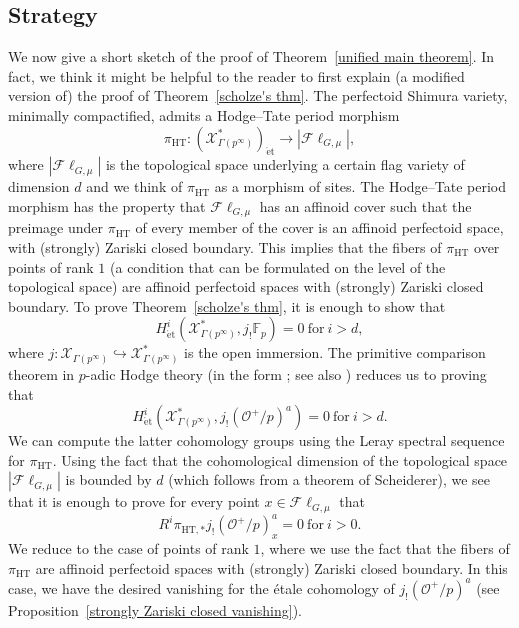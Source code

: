 \documentclass{amsart}
\theoremstyle{remark}
\numberwithin{equation}{subsection}
\newcommand{\F}{\FF}
\newcommand{\FF}{{\mathbb F}}
\newcommand{\cO}{{\mathcal O}}
\newcommand{\cX}{{\mathcal X}}
\newcommand{\HT}{\mathrm{HT}}
\newcommand{\et}{\mathrm{\acute{e}t}}
\newcommand{\Fl}{\mathscr{F}\!\ell}
\renewcommand{\(}{\left(}
\renewcommand{\)}{\right)}
\begin{document}
\subsection{Strategy}\label{strategy} We now give a short sketch of the proof of Theorem~\ref{unified main theorem}. In fact, we think it might be helpful to the reader to first explain (a modified version of) the proof of Theorem~\ref{scholze's thm}. The perfectoid Shimura variety, minimally compactified, admits a Hodge--Tate period morphism
\[
\pi_{\mathrm{HT}}\colon (\cX^*_{\Gamma(p^\infty)})_{\et}\to |\Fl_{G,\mu}|, 
\] 
where $|\Fl_{G,\mu}|$ is the topological space underlying a certain flag variety of dimension $d$ and we think of $\pi_{\HT}$ as a morphism of sites. The Hodge--Tate period morphism has the property that $\Fl_{G,\mu}$ has an affinoid cover such that the preimage under $\pi_{\HT}$ of every member of the cover is an affinoid perfectoid space, with (strongly) Zariski closed boundary. This implies that the fibers of $\pi_{\HT}$ over points of rank $1$ (a condition that can be formulated on the level of the topological space) are affinoid perfectoid spaces with (strongly) Zariski closed boundary. To prove Theorem~\ref{scholze's thm}, it is enough to show that 
\[
H^i_{\et}(\cX^*_{\Gamma(p^\infty)}, j_{!}\F_p)=0\ \mathrm{for}\ i>d,
\]
where $j\colon\cX_{\Gamma(p^\infty)}\hookrightarrow \cX^*_{\Gamma(p^\infty)}$ is the open immersion. The primitive comparison theorem in $p$-adic Hodge theory (in the form \cite[Theorem 3.13]{scholze-survey}; see also \cite[\S 3, Theorem 8]{faltings}) reduces us to proving that 
\[
H^i_{\et}\left(\cX^*_{\Gamma(p^\infty)}, j_{!}(\cO^+/p)^a\right)=0\ \mathrm{for}\ i>d.
\] 
We can compute the latter cohomology groups using the Leray spectral sequence for $\pi_{\HT}$. Using the fact that the cohomological dimension of the topological space $|\Fl_{G,\mu}|$ is bounded by $d$ (which follows from a theorem of Scheiderer), we see that it is enough to prove for every point $x\in \Fl_{G,\mu}$ that
\[
R^i\pi_{\HT,*}j_{!}(\cO^+/p)^a_x=0\ \mathrm{for}\ i>0.
\]
We reduce to the case of points of rank $1$, where we use the fact that the fibers of $\pi_{\HT}$ are affinoid perfectoid spaces with (strongly) Zariski closed boundary. In this case, we have the desired vanishing for the \'etale cohomology of $j_{!}(\cO^+/p)^a$ (see Proposition~\ref{strongly Zariski closed vanishing}).   
\end{document}
